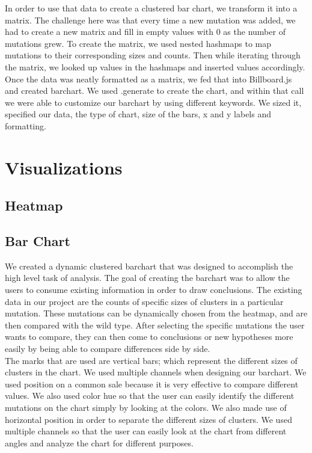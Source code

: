\documentclass[11pt]{IEEEtran}
\begin{document}
In order to use that data to create a clustered bar chart, we transform it into a matrix. The challenge here was that every time a new mutation was added, we had to create a new matrix and fill in empty values with 0 as the number of mutations grew. To create the matrix, we used nested hashmaps to map mutations to their corresponding sizes and counts. Then while iterating through the matrix, we looked up values in the hashmaps and inserted values accordingly.\\

Once the data was neatly formatted as a matrix, we fed that into Billboard.js and created barchart. We used .generate to create the chart, and within that call we were able to customize our barchart by using different keywords. We sized it, specified our data, the type of chart, size of the bars, x and y labels and formatting.

\section{Visualizations}
\subsection{Heatmap}\label{AA}
\subsection{Bar Chart}\label{AA}
We created a dynamic clustered barchart that was designed to accomplish the high level task of analysis. The goal of creating the barchart was to allow the users to consume existing information in order to draw conclusions. The existing data in our project are the counts of specific sizes of clusters in a particular mutation. These mutations can be dynamically chosen from the heatmap, and are then compared with the wild type. After selecting the specific mutations the user wants to compare, they can then come to conclusions or new hypotheses more easily by being able to compare differences side by side. \\

The marks that are used are vertical bars; which represent the different sizes of clusters in the chart. We used multiple channels when designing our barchart. We used position on a common sale because it is very effective to compare different values. We also used color hue so that the user can easily identify the different mutations on the chart simply by looking at the colors. We also made use of horizontal position in order to separate the different sizes of clusters. We used multiple channels so that the user can easily look at the chart from different angles and analyze the chart for different purposes.\\ 
\end{document}
